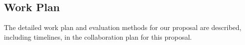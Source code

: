 \subsection{Work Plan}

The detailed work plan and evaluation methods for our proposal are
described, including timelines, in the collaboration plan for this proposal.

%

% 



